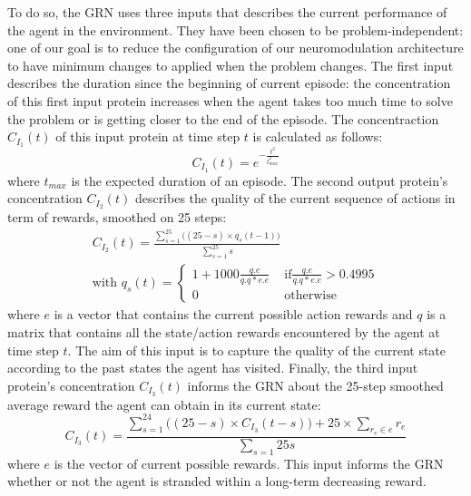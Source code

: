 To do so, the GRN uses three inputs that describes the current performance of the agent in the environment. They have been chosen to be problem-independent: one of our goal is to reduce the configuration of our neuromodulation architecture to have minimum changes to applied when the problem changes. The first input describes the duration since the beginning of current episode: the concentration of this first input protein increases when the agent takes too much time to solve the problem or is getting closer to the end of the episode. The concentraction $C_{I_1}(t)$ of this input protein at time step $t$ is calculated as follows:
\begin{equation}
C_{I_1}(t)=e^{-\frac{t^2}{t_{max}^2}}
\end{equation}
where $t_{max}$ is the expected duration of an episode. The second output protein's concentration $C_{I_2}(t)$ describes the quality of the current sequence of actions in term of rewards, smoothed on 25 steps:
\begin{eqnarray}
C_{I_2}(t)=\frac{\sum\limits_{s=1}^{25}{\Big((25-s)\times q_s(t-1)\Big)}}{\sum\limits_{s=1}^{25}s} \\
\text{with }q_s(t)=
\begin{cases}
1+1000\frac{q.e}{q.q*e.e} & \text{ if} \frac{q.e}{q.q*e.e}>0.4995\\
0 & \text{ otherwise}
\end{cases}\nonumber
\end{eqnarray}
where $e$ is a vector that contains the current possible action rewards and $q$ is a matrix that contains all the state/action rewards encountered by the agent at time step $t$. The aim of this input is to capture the quality of the current state according to the past states the agent has visited. Finally, the third input protein's concentration $C_{I_3}(t)$ informs the GRN about the 25-step smoothed average reward the agent can obtain in its current state:
\begin{equation}
C_{I_3}(t)=\frac{\sum\limits_{s=1}^{24}{\Big((25-s)\times C_{I_3}(t-s)\Big)}+25\times \sum\limits_{r_e\in e}{r_e}}{\sum\limits_{s=1}{25}s}
\end{equation}
where $e$ is the vector of current possible rewards. This input informs the GRN whether or not the agent is stranded within a long-term decreasing reward. 

